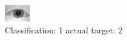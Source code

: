 \begin{figure}[h!]
\begin{center}
\includegraphics[width=0.60\columnwidth]{figures/ID1010_class_1_target_2.png}
\end{center}
\caption{ Classification: 1 actual target: 2}
\label{fig:ID1010_class_1_target_2}
\end{figure}
